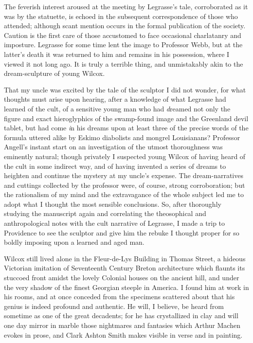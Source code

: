 \sectionbreak

The feverish interest aroused at the meeting by Legrasse’s tale, corroborated as it was by the statuette, is echoed in the subsequent correspondence of those who attended; although scant mention occurs in the formal publication of the society. Caution is the first care of those accustomed to face occasional charlatanry and imposture. Legrasse for some time lent the image to Professor Webb, but at the latter’s death it was returned to him and remains in his possession, where I viewed it not long ago. It is truly a terrible thing, and unmistakably akin to the dream-sculpture of young Wilcox.

That my uncle was excited by the tale of the sculptor I did not wonder, for what thoughts must arise upon hearing, after a knowledge of what Legrasse had learned of the cult, of a sensitive young man who had {\emph dreamed} not only the figure and exact hieroglyphics of the swamp-found image and the Greenland devil tablet, but had come {\emph in his dreams} upon at least three of the precise words of the formula uttered alike by Eskimo diabolists and mongrel Louisianans? Professor Angell’s instant start on an investigation of the utmost thoroughness was eminently natural; though privately I suspected young Wilcox of having heard of the cult in some indirect way, and of having invented a series of dreams to heighten and continue the mystery at my uncle’s expense. The dream-narratives and cuttings collected by the professor were, of course, strong corroboration; but the rationalism of my mind and the extravagance of the whole subject led me to adopt what I thought the most sensible conclusions. So, after thoroughly studying the manuscript again and correlating the theosophical and anthropological notes with the cult narrative of Legrasse, I made a trip to Providence to see the sculptor and give him the rebuke I thought proper for so boldly imposing upon a learned and aged man.

Wilcox still lived alone in the Fleur-de-Lys Building in Thomas Street, a hideous Victorian imitation of Seventeenth Century Breton architecture which flaunts its stuccoed front amidst the lovely Colonial houses on the ancient hill, and under the very shadow of the finest Georgian steeple in America. I found him at work in his rooms, and at once conceded from the specimens scattered about that his genius is indeed profound and authentic. He will, I believe, be heard from sometime as one of the great decadents; for he has crystallized in clay and will one day mirror in marble those nightmares and fantasies which Arthur Machen evokes in prose, and Clark Ashton Smith makes visible in verse and in painting.

